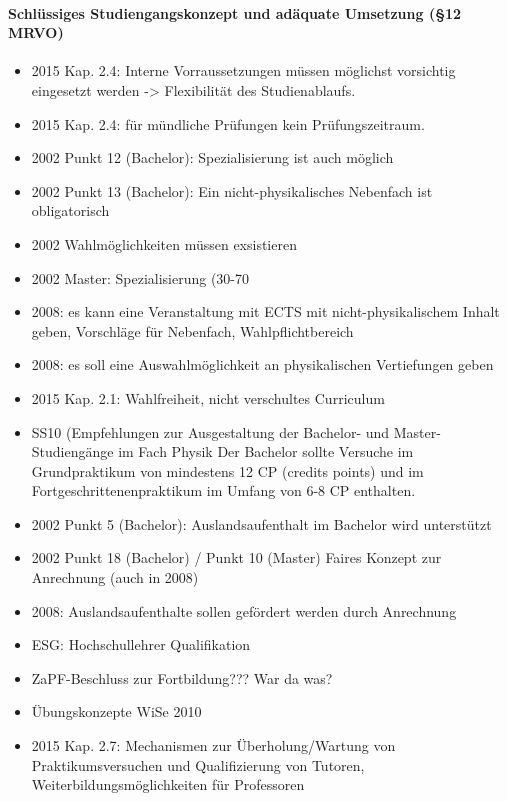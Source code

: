     \paragraph*{Schlüssiges Studiengangskonzept und adäquate Umsetzung (§12 MRVO)}
      \begin{itemize}
        \item 2015 Kap. 2.4: Interne Vorraussetzungen müssen möglichst vorsichtig eingesetzt werden -> Flexibilität des Studienablaufs.
        \item 2015 Kap. 2.4: für mündliche Prüfungen kein Prüfungszeitraum.
        \item 2002 Punkt 12 (Bachelor): Spezialisierung ist auch möglich
        \item 2002 Punkt 13 (Bachelor): Ein nicht-physikalisches Nebenfach ist obligatorisch
        \item 2002 Wahlmöglichkeiten müssen exsistieren
        \item 2002 Master: Spezialisierung (30-70 %
        \item 2008: es kann eine Veranstaltung mit ECTS mit nicht-physikalischem Inhalt geben, Vorschläge für Nebenfach, Wahlpflichtbereich
        \item 2008: es soll eine Auswahlmöglichkeit an physikalischen Vertiefungen geben
        \item 2015 Kap. 2.1: Wahlfreiheit, nicht verschultes Curriculum
        \item SS10 (Empfehlungen zur Ausgestaltung der Bachelor- und Master-Studiengänge im Fach Physik Der Bachelor sollte Versuche im Grundpraktikum von mindestens 12 CP (credits points) und im Fortgeschrittenenpraktikum im Umfang von 6-8 CP enthalten.
        \item 2002 Punkt 5 (Bachelor): Auslandsaufenthalt im Bachelor wird unterstützt
        \item 2002 Punkt 18 (Bachelor) / Punkt 10 (Master) Faires Konzept zur Anrechnung (auch in 2008)
        \item 2008: Auslandsaufenthalte sollen gefördert werden durch Anrechnung
        \item ESG: Hochschullehrer Qualifikation
        \item ZaPF-Beschluss zur Fortbildung??? War da was?
        \item Übungskonzepte WiSe 2010
        \item 2015 Kap. 2.7: Mechanismen zur Überholung/Wartung von Praktikumsversuchen und Qualifizierung von Tutoren, Weiterbildungsmöglichkeiten für Professoren

\end{itemize}
